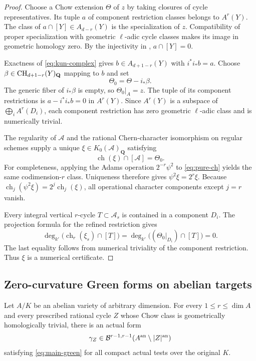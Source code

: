 \begin{proof}
Choose a Chow extension $\Theta$ of $z$ by taking closures of
cycle representatives.  Its tuple $a$ of component restriction
classes belongs to $A^r(Y)$.  The class of
$a\cap[Y]\in A_{d-r}(Y)$ is the specialization of $z$.
Compatibility of proper specialization with geometric
$\ell$-adic cycle classes makes its image in geometric homology
zero.  By the injectivity in ,
$a\cap[Y]=0$.

Exactness of \eqref{eq:kun-complex} gives
$b\in A_{d+1-r}(Y)$ with $i^*i_*b=a$.
Choose $\beta\in\operatorname{CH}_{d+1-r}(Y)_{\mathbf Q}$ mapping to $b$
and set
\[
                           \Theta_0=\Theta-i_*\beta.
\]
The generic fiber of $i_*\beta$ is empty, so $\Theta_0|_A=z$.
The tuple of its component restrictions is
$a-i^*i_*b=0$ in $A^r(Y)$.  Since $A^r(Y)$ is a subspace of
$\bigoplus_i A^r(D_i)$, each component restriction has zero
geometric $\ell$-adic class and is numerically trivial.

The regularity of $\mathcal A$ and the rational Chern-character
isomorphism on regular schemes
\cite[Tag 0FEY]{StacksFEY} supply a unique
$\xi\in K_0(\mathcal A)_{\mathbf Q}$ satisfying
\begin{equation}\label{eq:pure-ch}
                    \operatorname{ch}(\xi)\cap[\mathcal A]
                              =\Theta_0.
\end{equation}
For completeness, applying the Adams operation $2^{-r}\psi^2$
to \eqref{eq:pure-ch} yields the same codimension-$r$ class.
Uniqueness therefore gives $\psi^2\xi=2^r\xi$.
Because $\operatorname{ch}_j(\psi^2\xi)=2^j\operatorname{ch}_j(\xi)$,
all operational character components except $j=r$ vanish.

Every integral vertical $r$-cycle $T\subset\mathcal A_s$
is contained in a component $D_i$.  The projection formula for
the refined restriction gives
\[
 \deg_{k'}\bigl(\operatorname{ch}_r(\xi_s)\cap[T]\bigr)
 =\deg_{k'}\bigl((\Theta_0|_{D_i})\cap[T]\bigr)=0.
\]
The last equality follows from numerical triviality of the
component restriction.  Thus $\xi$ is a numerical certificate.
\end{proof}

\subsection{Zero-curvature Green forms on abelian targets}

\begin{theorem}
\label{thm:abelian-G}
Let $A/K$ be an abelian variety of arbitrary dimension.  For
every $1\le r\le\dim A$ and every prescribed rational cycle $Z$
whose Chow class is geometrically homologically trivial, there is
an actual form
\[
 \gamma_Z\in\mathcal B^{r-1,r-1}
                    (A^{\mathrm{an}}\setminus|Z|^{\mathrm{an}})
\]
satisfying \eqref{eq:main-green} for all compact actual tests
over the original $K$.
\end{theorem}

